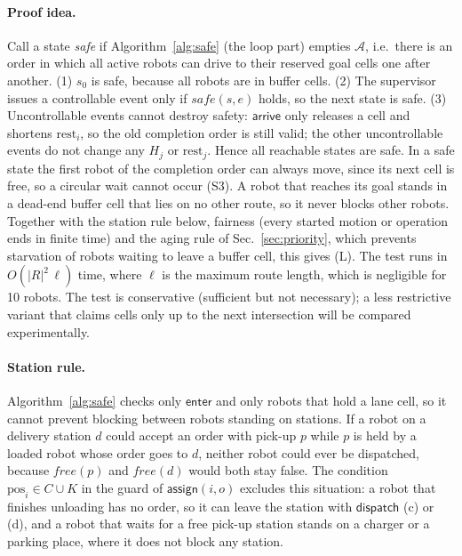\documentclass[11pt,a4paper]{article}
\newcommand{\ev}[1]{\mathsf{#1}}            %
\newcommand{\pos}{\mathrm{pos}}
\newcommand{\rest}{\mathrm{rest}}
\begin{document}
\paragraph{Proof idea.} Call a state \emph{safe} if Algorithm~\ref{alg:safe}
(the loop part) empties $\mathcal{A}$, i.e.\ there is an order in which all
active robots can drive to their reserved goal cells one after another.
(1) $s_0$ is safe, because all robots are in buffer cells.
(2) The supervisor issues a controllable event only if $\mathit{safe}(s,e)$
holds, so the next state is safe.
(3) Uncontrollable events cannot destroy safety: $\ev{arrive}$ only releases a
cell and shortens $\rest_i$, so the old completion order is still valid;
the other uncontrollable events do not change any $H_j$ or $\rest_j$.
Hence all reachable states are safe. In a safe state the first robot of the
completion order can always move, since its next cell is free, so a circular
wait cannot occur (S3). A robot that reaches its goal stands in a dead-end
buffer cell that lies on no other route, so it never blocks other robots.
Together with the station rule below, fairness (every started motion or
operation ends in finite time) and the aging rule of
Sec.~\ref{sec:priority}, which prevents starvation of robots waiting to leave
a buffer cell, this gives (L).
The test runs in $O(|R|^2\,\ell)$ time, where $\ell$ is the maximum route
length, which is negligible for 10 robots. The test is conservative
(sufficient but not necessary); a less restrictive variant that claims cells
only up to the next intersection will be compared experimentally.

\paragraph{Station rule.} Algorithm~\ref{alg:safe} checks only $\ev{enter}$
and only robots that hold a lane cell, so it cannot prevent blocking between
robots standing on stations. If a robot on a delivery station $d$ could accept
an order with pick-up $p$ while $p$ is held by a loaded robot whose order goes
to $d$, neither robot could ever be dispatched, because $\mathit{free}(p)$ and
$\mathit{free}(d)$ would both stay false. The condition $\pos_i\in C\cup K$ in
the guard of $\ev{assign}(i,o)$ excludes this situation: a robot that finishes
unloading has no order, so it can leave the station with $\ev{dispatch}$ (c)
or (d), and a robot that waits for a free pick-up station stands on a charger
or a parking place, where it does not block any station.
\end{document}
